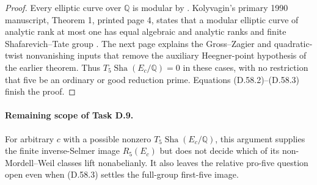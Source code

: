 \begin{proof}
Every elliptic curve over $\mathbb Q$ is modular by
\cite[Theorem A]{DE_BCDT2001}.  Kolyvagin's primary
1990 manuscript, Theorem 1, printed page 4, states that
a modular elliptic curve of analytic rank at most one
has equal algebraic and analytic ranks and finite
Shafarevich--Tate group \cite{DE_Kolyvagin1990}.
The next page explains the Gross--Zagier and
quadratic-twist nonvanishing inputs that remove the
auxiliary Heegner-point hypothesis of the earlier theorem.
Thus $T_5\operatorname{Sha}(E_c/\mathbb Q)=0$ in these cases, with no
restriction that five be an ordinary or good reduction
prime.  Equations (D.58.2)--(D.58.3) finish the proof.
\end{proof}

\paragraph{Remaining scope of Task D.9.}

For arbitrary $c$ with a possible nonzero
$T_5\operatorname{Sha}(E_c/\mathbb Q)$, this argument supplies the
finite inverse-Selmer image $R_5(E_c)$ but does not decide
which of its non-Mordell--Weil classes lift nonabelianly.
It also leaves the relative pro-five question open even
when (D.58.3) settles the full-group first-five image.
